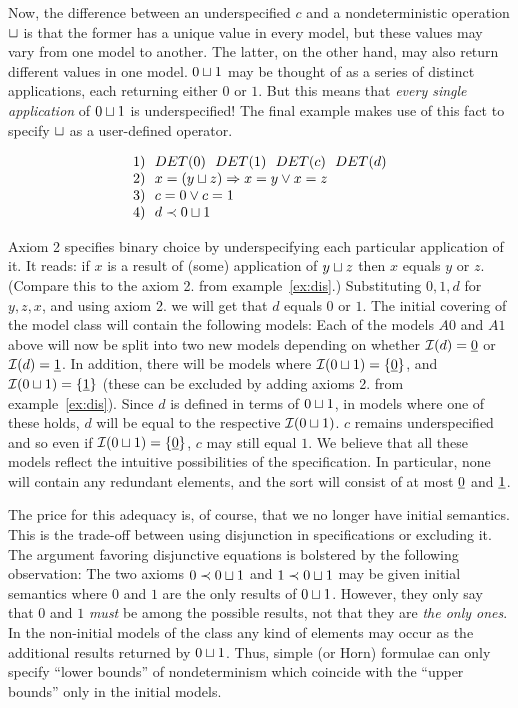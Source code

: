 {Now, the difference between an underspecified $c$ and a nondeterministic 
operation $\sqcup$ is that the former 
has a unique value in every model, but these values  may vary from one model to another. The latter, on 
the other hand, may also return different values in one model.  $0\sqcup 
1$  may be thought of as a series of 
distinct applications, each returning either $0$ or $1$. But this means 
that {\em every single application} of $0\sqcup 1$ is 
underspecified! The final example makes use of this fact to specify 
$\sqcup$ as a user-defined operator. 
\begin{Example} 
\[ \begin{array}{l@{\ \ }l}
	1) &	DET(0)\ \ DET(1)\ \ DET(c)\ \ DET(d) \\
	2) &	x=(y\ch z) \impl x=y \lor x=z \\
 	3) &	c=0 \lor c=1 \\
	4) &	d \Incl 0\ch 1
\end{array} \]
\end{Example}
Axiom 2 specifies binary choice by underspecifying each particular application of it. It reads: if $x$ is a result 
of (some) application of $y\sqcup z$ then $x$ equals $y$ or $z$. (Compare 
this to the axiom 2. from example~\ref{ex:dis}.) 
Substituting $0, 1, d$ for $y, z, x$, and using axiom 2. we will get that 
$d$ equals $0$ or $1$. The initial covering of 
the model class will contain the following models: Each of the 
models $A0$ and $A1$ above will now be split into 
two new models depending on whether ${\cal I}(d)=\underline{0}$ or ${\cal I}(d)=\underline{1}$. In addition, there will be models where 
${\cal I}(0\sqcup 1) = \{\underline{0}\}$, and ${\cal I}(0\sqcup 1) = \{\underline{1}\}$ (these can be excluded 
by adding axioms 2. from example~\ref{ex:dis}). Since $d$ is 
defined in terms of $0\sqcup 1$, in models where one of these holds, $d$ will 
be equal to the respective ${\cal I}(0\sqcup 1)$. $c$ 
remains underspecified and so even if ${\cal I}(0\sqcup 1)=\{\underline{0}\}$, $c$ may still 
equal $1$. We believe that all these models 
reflect the intuitive possibilities of the specification. In particular, none will contain any redundant 
elements, and the sort will consist of at most $\underline{0}$ and $\underline{1}$.
    
The price for this adequacy is, of course, that we no longer have initial semantics. This is the trade-off 
between using disjunction in specifications or excluding it.
The argument favoring disjunctive equations is bolstered by the following observation: The two 
axioms $0\mathrel{\prec} 0\sqcup 1$ and $1\mathrel{\prec} 0\sqcup 1$ may be given initial semantics where $0$ and $1$ are the 
only results of $0\sqcup 1$. However, 
they only say that $0$ and $1$ {\em must} be among the possible results, 
not that they are {\em the only ones}. In the non-initial models of the class any kind of elements may 
occur as the additional results returned by $0\sqcup 1$. Thus, 
simple (or Horn) formulae can only specify ``lower bounds'' of nondeterminism which coincide with the 
``upper bounds'' only in the initial models.

}
